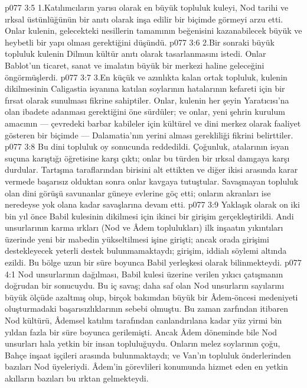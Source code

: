 \vs p077 3:5 1.\bibnobreakspace Katılımcıların yarısı olarak en büyük topluluk kuleyi, Nod tarihi ve ırksal üstünlüğünün bir anıtı olarak inşa edilir bir biçimde görmeyi arzu etti. Onlar kulenin, gelecekteki nesillerin tamamının beğenisini kazanabilecek büyük ve heybetli bir yapı olması gerektiğini düşündü.
\vs p077 3:6 2.\bibnobreakspace Bir sonraki büyük topluluk kulenin Dilmun kültür anıtı olarak tasarlanmasını istedi. Onlar Bablot’un ticaret, sanat ve imalatın büyük bir merkezi haline geleceğini öngörmüşlerdi.
\vs p077 3:7 3.\bibnobreakspace En küçük ve azınlıkta kalan ortak topluluk, kulenin dikilmesinin Caligastia isyanına katılan soylarının hatalarının kefareti için bir fırsat olarak sunulması fikrine sahiptiler. Onlar, kulenin her şeyin Yaratıcısı’na olan ibadete adanması gerektiğini öne sürdüler; ve onlar, yeni şehrin kurulum amacının --- çevredeki barbar kabileler için kültürel ve dini merkez olarak faaliyet gösteren bir biçimde --- Dalamatia’nın yerini alması gerekliliği fikrini belirttiler.
\vs p077 3:8 Bu dini topluluk oy sonucunda reddedildi. Çoğunluk, atalarının isyan suçuna karıştığı öğretisine karşı çıktı; onlar bu türden bir ırksal damgaya karşı durdular. Tartışma taraflarından birisini alt ettikten ve diğer ikisi arasında karar vermede başarısız olduktan sonra onlar kavgaya tutuştular. Savaşmayan topluluk olan dini görüşü savunanlar güneye evlerine göç etti; onların akranları ise neredeyse yok olana kadar savaşlarına devam etti.
\vs p077 3:9 Yaklaşık olarak on iki bin yıl önce Babil kulesinin dikilmesi için ikinci bir girişim gerçekleştirildi. Andi unsurlarının karma ırkları (Nod ve Âdem toplulukları) ilk inşaatın yıkıntıları üzerinde yeni bir mabedin yükseltilmesi işine girişti; ancak orada girişimi destekleyecek yeterli destek bulunmamaktaydı; girişim, iddialı söylemi altında ezildi. Bu bölge uzun bir süre boyunca Babil yerleşkesi olarak bilinmekteydi.
\vs p077 4:1 Nod unsurlarının dağılması, Babil kulesi üzerine verilen yıkıcı çatışmanın doğrudan bir sonucuydu. Bu iç savaş; daha saf olan Nod unsurların sayılarını büyük ölçüde azaltmış olup, birçok bakımdan büyük bir Âdem\hyp{}öncesi medeniyeti oluşturmadaki başarısızlıklarının sebebi olmuştu. Bu zaman zarfından itibaren Nod kültürü, Âdemsel katılım tarafından canlandırılana kadar yüz yirmi bin yıldan fazla bir süre boyunca gerilemişti. Ancak Âdem döneminde bile Nod unsurları hala yetkin bir insan topluluğuydu. Onların melez soylarının çoğu, Bahçe inşaat işçileri arasında bulunmaktaydı; ve Van’ın topluluk önderlerinden bazıları Nod üyeleriydi. Âdem’in görevlileri konumunda hizmet eden en yetkin akılların bazıları bu ırktan gelmekteydi.
